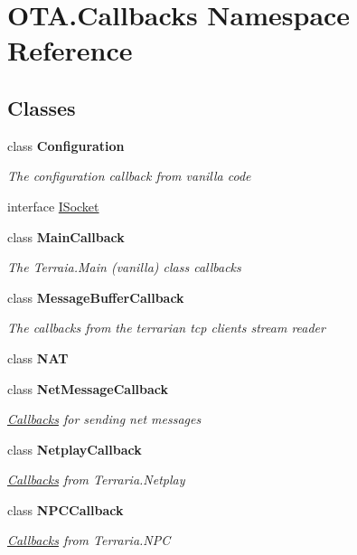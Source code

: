 \hypertarget{namespace_o_t_a_1_1_callbacks}{}\section{O\+T\+A.\+Callbacks Namespace Reference}
\label{namespace_o_t_a_1_1_callbacks}
\subsection*{Classes}
\begin{DoxyCompactItemize}
\item 
class {\bfseries Configuration}
\begin{DoxyCompactList}\small\item\em The configuration callback from vanilla code \end{DoxyCompactList}\item 
interface \hyperlink{interface_o_t_a_1_1_callbacks_1_1_i_socket}{I\+Socket}
\item 
class {\bfseries Main\+Callback}
\begin{DoxyCompactList}\small\item\em The Terraia.\+Main (vanilla) class callbacks \end{DoxyCompactList}\item 
class {\bfseries Message\+Buffer\+Callback}
\begin{DoxyCompactList}\small\item\em The callbacks from the terrarian tcp clients\textquotesingle{} stream reader \end{DoxyCompactList}\item 
class {\bfseries N\+A\+T}
\item 
class {\bfseries Net\+Message\+Callback}
\begin{DoxyCompactList}\small\item\em \hyperlink{namespace_o_t_a_1_1_callbacks}{Callbacks} for sending net messages \end{DoxyCompactList}\item 
class {\bfseries Netplay\+Callback}
\begin{DoxyCompactList}\small\item\em \hyperlink{namespace_o_t_a_1_1_callbacks}{Callbacks} from Terraria.\+Netplay \end{DoxyCompactList}\item 
class {\bfseries N\+P\+C\+Callback}
\begin{DoxyCompactList}\small\item\em \hyperlink{namespace_o_t_a_1_1_callbacks}{Callbacks} from Terraria.\+N\+P\+C \end{DoxyCompactList}\item 

\end{DoxyCompactItemize}
